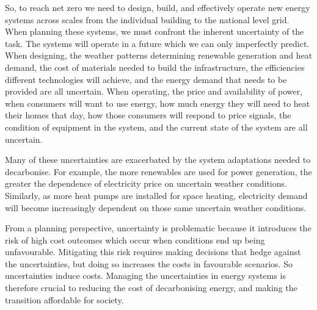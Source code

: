 
So, to reach net zero we need to design, build, and effectively operate new energy systems across scales from the individual building to the national level grid. When planning these systems, we must confront the inherent uncertainty of the task. The systems will operate in a future which we can only imperfectly predict. When designing, the weather patterns determining renewable generation and heat demand, the cost of materials needed to build the infrastructure, the efficiencies different technologies will achieve, and the energy demand that needs to be provided are all uncertain.
When operating, the price and availability of power, when consumers will want to use energy, how much energy they will need to heat their homes that day, how those consumers will respond to price signals, the condition of equipment in the system, and the current state of the system are all uncertain.

Many of these uncertainties are exacerbated by the system adaptations needed to decarbonise. For example, the more renewables are used for power generation, the greater the dependence of electricity price on uncertain weather conditions. Similarly, as more heat pumps are installed for space heating, electricity demand will become increasingly dependent on those same uncertain weather conditions.

From a planning perspective, uncertainty is problematic because it introduces the risk of high cost outcomes which occur when conditions end up being unfavourable. Mitigating this risk requires making decisions that hedge against the uncertainties, but doing so increases the costs in favourable scenarios. So uncertainties induce costs. Managing the uncertainties in energy systems is therefore crucial to reducing the cost of decarbonising energy, and making the transition affordable for society.\\

